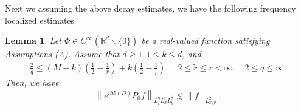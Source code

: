 \documentclass[a4paper,11pt, reqno]{amsart}
\newtheorem{lem}[theorem]{Lemma}
\theoremstyle{definition}
\theoremstyle{remark}
\numberwithin{equation}{section}
\begin{document}
	Next we assuming the above decay estimates, we have the following  frequency localized estimates
	\begin{lem} \label{Loc} Let $\Phi \in C^{\infty}\left(\mathbb{R}^{d} \backslash\{0\}\right)$ be a real-valued function satisfying Assumptions (A). Assume that $d \geq 1,1 \leq k \leq d$, and
		\begin{align*}
			\frac{2}{q} \leq(M-k)\left(\frac{1}{2}-\frac{1}{r}\right)+k\left(\frac{1}{2}-\frac{1}{\widetilde{r}}\right), \quad 2 \leq \widetilde{r} \leq r<\infty, \quad 2\leq q \leq \infty. 
		\end{align*}
		Then, we have  
		\begin{align}\label{eq4}
			\left\|e^{i t\Phi(D)} P_0 f\right\|_{L_t^q L_x^r L_y^{\tilde{\tau}}} \lesssim\|f\|_{L_{x, y}^2}.
		\end{align}
		
	\end{lem}
\end{document}
